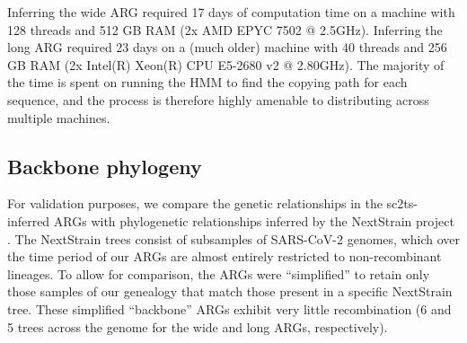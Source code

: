 \documentclass{article}
\begin{document}
Inferring the wide ARG required 17 days of computation time on a machine with
128 threads and 512 GB RAM (2x AMD EPYC 7502 @ 2.5GHz). Inferring the long ARG
required 23 days on a (much older) machine with 40 threads and 256 GB RAM (2x
Intel(R) Xeon(R) CPU E5-2680 v2 @ 2.80GHz). The majority of the time is spent
on running the HMM to find the copying path for each sequence, and the process
is therefore highly amenable to distributing across multiple machines.

\subsection{Backbone phylogeny}
For validation purposes, we compare the genetic relationships in the sc2ts-inferred ARGs with phylogenetic relationships inferred by the NextStrain project \citep{Hadfield2018-ef}. The NextStrain trees consist of subsamples of SARS-CoV-2 genomes, which over the time period of our ARGs are almost entirely restricted to non-recombinant lineages. To allow for comparison, the ARGs were ``simplified'' \citep{Kelleher2018-xc} to retain only those samples of our genealogy that match those present in a specific NextStrain tree. These simplified ``backbone'' ARGs exhibit very little recombination (6 and 5 trees across the genome for the wide and long ARGs, respectively).
\end{document}

